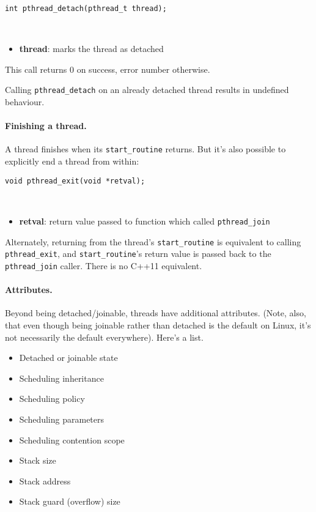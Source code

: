 \documentclass[11pt]{article}
\begin{document}
\begin{lstlisting}
int pthread_detach(pthread_t thread);
\end{lstlisting}
~\vspace*{-3em}
\begin{itemize}
\item  {\bf thread}: marks the thread as detached
\end{itemize}

This call returns 0 on success, error number otherwise.

Calling {\tt pthread\_detach} on an already detached thread results in undefined
behaviour.

\paragraph{Finishing a thread.} A thread finishes when its {\tt start\_routine}
returns. But it's also possible to explicitly end a thread from within:

\begin{lstlisting}
void pthread_exit(void *retval);
\end{lstlisting}
~\vspace*{-3em}
\begin{itemize}
\item  {\bf retval}: return value passed to function which called {\tt pthread\_join}
\end{itemize}

Alternately, returning from the thread's {\tt start\_routine} is equivalent
to calling {\tt pthread\_exit}, and {\tt start\_routine}'s return value
is passed back to the {\tt pthread\_join} caller. There is no C++11 equivalent.

\newpage \paragraph{Attributes.} Beyond being detached/joinable, threads have additional
attributes. (Note, also, that even though being joinable rather than
detached is the default on Linux, it's not necessarily the default everywhere).
Here's a list.
  \begin{itemize}
    \item Detached or joinable state
    \item Scheduling inheritance
    \item Scheduling policy
    \item Scheduling parameters
    \item Scheduling contention scope
    \item Stack size
    \item Stack address
    \item Stack guard (overflow) size
  \end{itemize}
\end{document}
